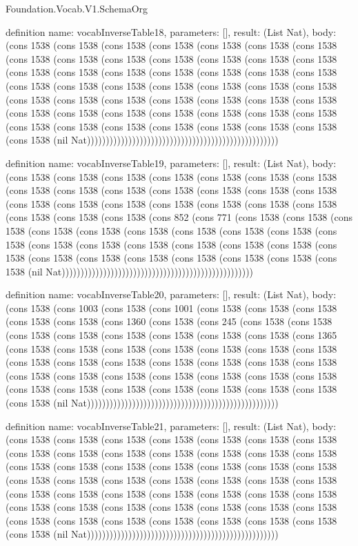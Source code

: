 \begin{lexlean}{Foundation.Vocab.V1.SchemaOrg}
\begin{semanticmodule}
definition{
  name: vocabInverseTable18,
  parameters: [],
  result: (List Nat),
  body: (cons 1538 (cons 1538 (cons 1538 (cons 1538 (cons 1538 (cons 1538 (cons 1538 (cons 1538 (cons 1538 (cons 1538 (cons 1538 (cons 1538 (cons 1538 (cons 1538 (cons 1538 (cons 1538 (cons 1538 (cons 1538 (cons 1538 (cons 1538 (cons 1538 (cons 1538 (cons 1538 (cons 1538 (cons 1538 (cons 1538 (cons 1538 (cons 1538 (cons 1538 (cons 1538 (cons 1538 (cons 1538 (cons 1538 (cons 1538 (cons 1538 (cons 1538 (cons 1538 (cons 1538 (cons 1538 (cons 1538 (cons 1538 (cons 1538 (cons 1538 (cons 1538 (cons 1538 (cons 1538 (cons 1538 (cons 1538 (cons 1538 (cons 1538 (nil Nat)))))))))))))))))))))))))))))))))))))))))))))))))))
}

definition{
  name: vocabInverseTable19,
  parameters: [],
  result: (List Nat),
  body: (cons 1538 (cons 1538 (cons 1538 (cons 1538 (cons 1538 (cons 1538 (cons 1538 (cons 1538 (cons 1538 (cons 1538 (cons 1538 (cons 1538 (cons 1538 (cons 1538 (cons 1538 (cons 1538 (cons 1538 (cons 1538 (cons 1538 (cons 1538 (cons 1538 (cons 1538 (cons 1538 (cons 1538 (cons 852 (cons 771 (cons 1538 (cons 1538 (cons 1538 (cons 1538 (cons 1538 (cons 1538 (cons 1538 (cons 1538 (cons 1538 (cons 1538 (cons 1538 (cons 1538 (cons 1538 (cons 1538 (cons 1538 (cons 1538 (cons 1538 (cons 1538 (cons 1538 (cons 1538 (cons 1538 (cons 1538 (cons 1538 (cons 1538 (nil Nat)))))))))))))))))))))))))))))))))))))))))))))))))))
}

definition{
  name: vocabInverseTable20,
  parameters: [],
  result: (List Nat),
  body: (cons 1538 (cons 1003 (cons 1538 (cons 1001 (cons 1538 (cons 1538 (cons 1538 (cons 1538 (cons 1538 (cons 1360 (cons 1538 (cons 245 (cons 1538 (cons 1538 (cons 1538 (cons 1538 (cons 1538 (cons 1538 (cons 1538 (cons 1538 (cons 1365 (cons 1538 (cons 1538 (cons 1538 (cons 1538 (cons 1538 (cons 1538 (cons 1538 (cons 1538 (cons 1538 (cons 1538 (cons 1538 (cons 1538 (cons 1538 (cons 1538 (cons 1538 (cons 1538 (cons 1538 (cons 1538 (cons 1538 (cons 1538 (cons 1538 (cons 1538 (cons 1538 (cons 1538 (cons 1538 (cons 1538 (cons 1538 (cons 1538 (cons 1538 (nil Nat)))))))))))))))))))))))))))))))))))))))))))))))))))
}

definition{
  name: vocabInverseTable21,
  parameters: [],
  result: (List Nat),
  body: (cons 1538 (cons 1538 (cons 1538 (cons 1538 (cons 1538 (cons 1538 (cons 1538 (cons 1538 (cons 1538 (cons 1538 (cons 1538 (cons 1538 (cons 1538 (cons 1538 (cons 1538 (cons 1538 (cons 1538 (cons 1538 (cons 1538 (cons 1538 (cons 1538 (cons 1538 (cons 1538 (cons 1538 (cons 1538 (cons 1538 (cons 1538 (cons 1538 (cons 1538 (cons 1538 (cons 1538 (cons 1538 (cons 1538 (cons 1538 (cons 1538 (cons 1538 (cons 1538 (cons 1538 (cons 1538 (cons 1538 (cons 1538 (cons 1538 (cons 1538 (cons 1538 (cons 1538 (cons 1538 (cons 1538 (cons 1538 (cons 1538 (cons 1538 (nil Nat)))))))))))))))))))))))))))))))))))))))))))))))))))
}


\end{semanticmodule}
\end{lexlean}
